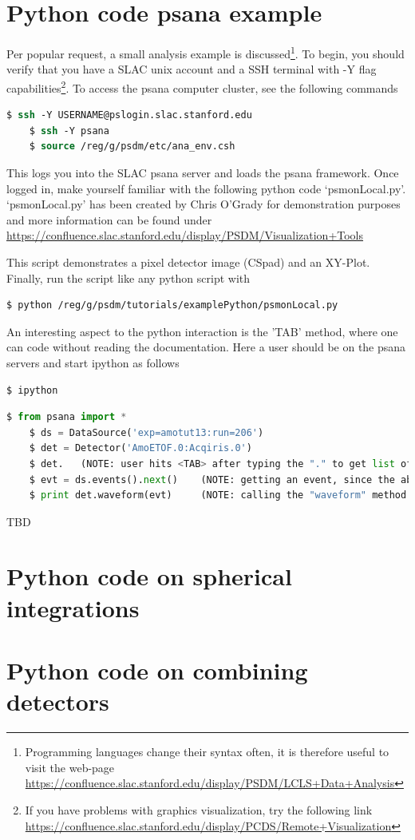 \section{Python code psana example}\label{sec:python-example}
Per popular request, a small analysis example is discussed\footnote{Programming languages change their syntax often, it is therefore useful to visit the web-page\\ \url{https://confluence.slac.stanford.edu/display/PSDM/LCLS+Data+Analysis}}. To begin, you should verify that you have a SLAC unix account and a SSH terminal with -Y flag capabilities\footnote{If you have problems with graphics visualization, try the following link\\ \url{https://confluence.slac.stanford.edu/display/PCDS/Remote+Visualization}}. To access the psana computer cluster, see the following commands
\begin{lstlisting}[language=csh]
	$ ssh -Y USERNAME@pslogin.slac.stanford.edu
	$ ssh -Y psana
	$ source /reg/g/psdm/etc/ana_env.csh
\end{lstlisting}
This logs you into the SLAC psana server and loads the psana framework. Once logged in, make yourself familiar with the following python code ‘psmonLocal.py’. ‘psmonLocal.py’ has been created by Chris O'Grady for demonstration purposes and more information can be found under\\
\url{https://confluence.slac.stanford.edu/display/PSDM/Visualization+Tools}

This script demonstrates a pixel detector image (CSpad) and an XY-Plot. Finally, run the script like any python script with
\begin{lstlisting}[language=csh]
	$ python /reg/g/psdm/tutorials/examplePython/psmonLocal.py
\end{lstlisting}
An interesting aspect to the python interaction is the 'TAB' method, where one can code without reading the documentation. Here a user should be on the psana servers and start ipython as follows
\begin{lstlisting}[language=csh]
	$ ipython
\end{lstlisting}
\begin{lstlisting}[language=Python]
	$ from psana import *
	$ ds = DataSource('exp=amotut13:run=206')
	$ det = Detector('AmoETOF.0:Acqiris.0')
	$ det.   (NOTE: user hits <TAB> after typing the "." to get list of available methods)
	$ evt = ds.events().next()    (NOTE: getting an event, since the above "Definition" line requires it)
	$ print det.waveform(evt)     (NOTE: calling the "waveform" method as required by the above "Definition" line)
\end{lstlisting}
TBD
%
%
%
\section{Python code on spherical integrations}
\section{Python code on combining detectors}